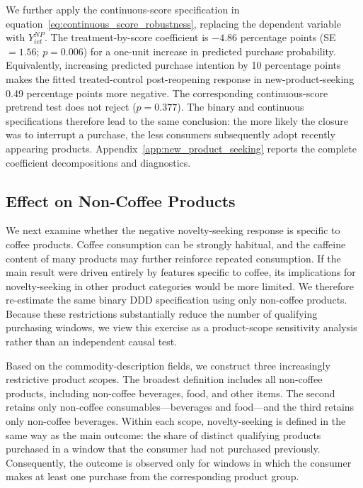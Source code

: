 \documentclass[11 pt]{article}
\begin{document}
We further apply the continuous-score specification in equation~\eqref{eq:continuous_score_robustness}, replacing the dependent variable with $Y^{NP}_{iet}$. The treatment-by-score coefficient is $-4.86$ percentage points (SE $=1.56$; $p=0.006$) for a one-unit increase in predicted purchase probability. Equivalently, increasing predicted purchase intention by 10 percentage points makes the fitted treated-control post-reopening response in new-product-seeking 0.49 percentage points more negative. The corresponding continuous-score pretrend test does not reject ($p=0.377$). The binary and continuous specifications therefore lead to the same conclusion: the more likely the closure was to interrupt a purchase, the less consumers subsequently adopt recently appearing products. Appendix~\ref{app:new_product_seeking} reports the complete coefficient decompositions and diagnostics.

\subsection{Effect on Non-Coffee Products}
\label{section:robustness_noncoffee}

We next examine whether the negative novelty-seeking response is specific to coffee products. Coffee consumption can be strongly habitual, and the caffeine content of many products may further reinforce repeated consumption. If the main result were driven entirely by features specific to coffee, its implications for novelty-seeking in other product categories would be more limited. We therefore re-estimate the same binary DDD specification using only non-coffee products. Because these restrictions substantially reduce the number of qualifying purchasing windows, we view this exercise as a product-scope sensitivity analysis rather than an independent causal test.

Based on the commodity-description fields, we construct three increasingly restrictive product scopes. The broadest definition includes all non-coffee products, including non-coffee beverages, food, and other items. The second retains only non-coffee consumables---beverages and food---and the third retains only non-coffee beverages. Within each scope, novelty-seeking is defined in the same way as the main outcome: the share of distinct qualifying products purchased in a window that the consumer had not purchased previously. Consequently, the outcome is observed only for windows in which the consumer makes at least one purchase from the corresponding product group.
\end{document}
